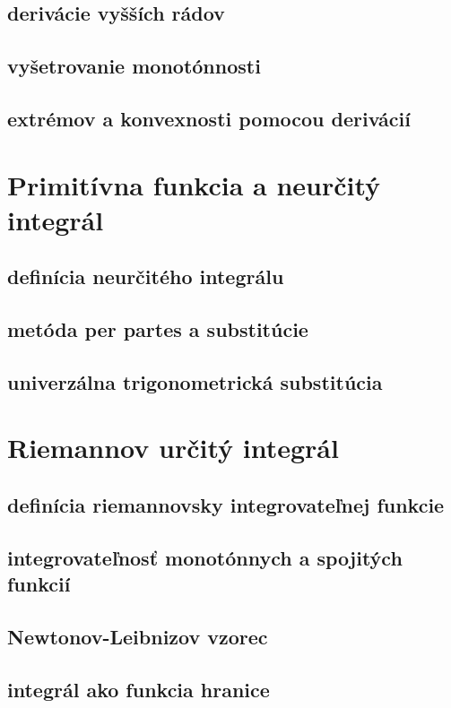 \subsection{derivácie vyšších rádov}
\subsection{vyšetrovanie monotónnosti}
\subsection{extrémov a konvexnosti pomocou derivácií}


\section{Primitívna funkcia a neurčitý integrál}
\subsection{definícia neurčitého integrálu}
\subsection{metóda per partes a substitúcie}
\subsection{univerzálna trigonometrická substitúcia}


\section{Riemannov určitý integrál}
\subsection{definícia riemannovsky integrovateľnej funkcie}
\subsection{integrovateľnosť monotónnych a spojitých funkcií}
\subsection{Newtonov-Leibnizov vzorec}
\subsection{integrál ako funkcia hranice}


